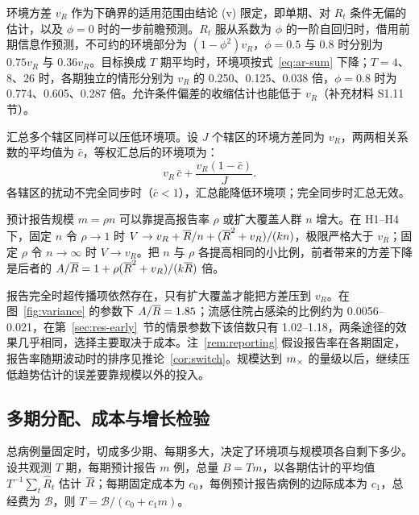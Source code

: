 环境方差 $v_R$ 作为下确界的适用范围由结论 (v) 限定，即单期、对 $R_t$ 条件无偏的估计，以及 $\phi=0$ 时的一步前瞻预测。$R_t$ 服从系数为 $\phi$ 的一阶自回归时，借用前期信息作预测，不可约的环境部分为 $(1-\phi^2)v_R$，$\phi=0.5$ 与 $0.8$ 时分别为 $0.75v_R$ 与 $0.36v_R$。目标换成 $T$ 期平均时，环境项按式~\eqref{eq:ar-sum} 下降；$T=4$、8、26 时，各期独立的情形分别为 $v_R$ 的 0.250、0.125、0.038 倍，$\phi=0.8$ 时为 0.774、0.605、0.287 倍。允许条件偏差的收缩估计也能低于 $v_R$（补充材料 S1.11 节）。

汇总多个辖区同样可以压低环境项。设 $J$ 个辖区的环境方差同为 $v_R$，两两相关系数的平均值为 $\bar c$，等权汇总后的环境项为：
\begin{equation}
  v_R\,\bar c+\frac{v_R(1-\bar c)}{J}.
  \label{eq:pooling}
\end{equation}
各辖区的扰动不完全同步时（$\bar c<1$），汇总能降低环境项；完全同步时汇总无效。

\begin{remark}[报告率与覆盖面]
\label{rem:reporting}
预计报告规模 $m=\rho n$ 可以靠提高报告率 $\rho$ 或扩大覆盖人群 $n$ 增大。在 H1--H4 下，固定 $n$ 令 $\rho\to1$ 时 $V\to v_R+\overline{R}/n+(\overline{R}^2+v_R)/(kn)$，极限严格大于 $v_R$；固定 $\rho$ 令 $n\to\infty$ 时 $V\to v_R$。把 $n$ 与 $\rho$ 各提高相同的小比例，前者带来的方差下降是后者的 $A/\overline{R}=1+\rho(\overline{R}^2+v_R)/(k\overline{R})$ 倍。
\end{remark}

报告完全时超传播项依然存在，只有扩大覆盖才能把方差压到 $v_R$。在图~\ref{fig:variance} 的参数下 $A/\overline{R}=1.85$；流感住院占感染的比例约为 0.0056--0.021\citep{zhou2012hospitalizations, tokars2018seasonal}，在第~\ref{sec:res-early}~节的情景参数下该倍数只有 1.02--1.18，两条途径的效果几乎相同，选择主要取决于成本。注~\ref{rem:reporting} 假设报告率在各期固定，报告率随期波动时的排序见推论~\ref{cor:switch}。规模达到 $m_{\times}$ 的量级以后，继续压低趋势估计的误差要靠规模以外的投入。

\subsection{多期分配、成本与增长检验}
\label{sec:res-allocation}
\label{sec:res-test}

总病例量固定时，切成多少期、每期多大，决定了环境项与规模项各自剩下多少。设共观测 $T$ 期，每期预计报告 $m$ 例，总量 $B=Tm$，以各期估计的平均值 $T^{-1}\sum_t\widehat R_t$ 估计 $\overline{R}$；每期固定成本为 $c_0$，每例预计报告病例的边际成本为 $c_1$，总经费为 $\mathcal B$，则 $T=\mathcal B/(c_0+c_1m)$。

